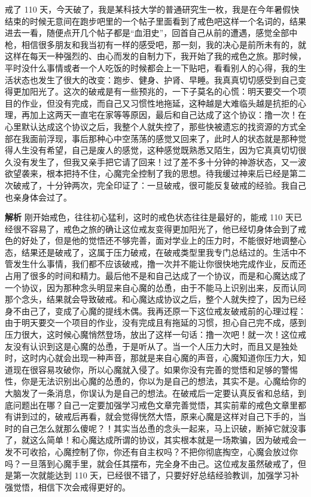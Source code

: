 \begin{case}
    戒了 110 天，今天破了，我是某科技大学的普通研究生一枚，我是在今年暑假快结束的时候无意间在跑步吧里的一个帖子里面看到了戒色吧这样一个名词的，结果进去一看，随便点开几个帖子都是“血泪史”，回首自己从前的遭遇，感觉全部中枪，相信很多朋友和我当初有一样的感受吧，那一刻，我的决心是前所未有的，就这样在每天一种强烈的、由心而发的自制力下，我开始了我的戒色之旅。那时候，平时没什么事情或者一个人吃饭的时候都会上一下贴吧，看看别人的心得，我的生活状态也发生了很大的改变：跑步、健身、护肾、早睡。我真真切切感受到自己变得更加阳光了。这次的破戒是有一些预兆的，一下子莫名的心慌：明天要交一个项目的作业，但没有完成，而自己又习惯性地拖延，这种越是大难临头越是抗拒的心理，再加上这两天一直宅在家等等原因，最后和自己达成了这个协议：撸一次！在心里默认达成这个协议之后，我整个人就失控了，那些快被遗忘的找资源的方式全部在我面前浮现，事后那种心中空荡荡的感觉又回来了，此时人的状态就是那种觉得人生没有希望，自己是废人的感觉，这种感觉既熟悉又陌生，因为它真真切切很久没有发生了，但我又亲手把它请了回来！过了差不多十分钟的神游状态，又一波欲望袭来，根本把持不住，心魔完全控制了我的思想。待我缓过神来后已经是第二次破戒了，十分钟两次，完全印证了：一旦破戒，很可能反复破戒的经验。我自己也亲身体会过了。

    \textbf{解析} 刚开始戒色，往往初心猛利，这时的戒色状态往往是最好的，能戒 110 天已经很不容易了，戒色之旅的确让这位戒友变得更加阳光了，他已经切身体会到了戒色的好处了，但是他的觉悟还不够完善，面对学业上的压力时，不能很好地调整心态，结果还是破戒了，这属于压力破戒，在破戒类型里我专门总结过的。生活中不管发生什么事情，我们都不应该破戒，撸一次并不能让你很快地完成作业，反而还占用了很多的时间和精力。最后他不是和自己达成了一个协议，而是和心魔达成了一个协议，因为那种念头明显来自心魔的怂恿，由于不能马上识别出来，反而认同那个念头，结果就会导致破戒。和心魔达成协议之后，整个人就失控了，因为已经身不由己了，变成了心魔的提线木偶。我再还原一下这位戒友破戒前的心理过程：由于明天要交一个项目的作业，没有完成且有拖延的习惯，担心自己完不成，感到压力很大，这时候心魔悄然登场，放出了这样一句话：撸一次吧！就一次！这位戒友没有认识到这是心魔的怂恿，于是听从了。当一个人压力大时，而且又是独处时，这时内心就会出现一种声音，那就是来自心魔的声音，心魔知道你压力大，知道现在很容易攻破你，所以心魔就入侵了。如果你没有完善的觉悟和足够的警惕性，你是无法识别出心魔的怂恿的，你以为是自己的想法，其实不是。心魔给你的大脑发了一条消息，你误认为是自己的想法。在破戒后一定要认真反省和总结，到底问题出在哪？自己一定要加强学习戒色文章完善觉悟，其实前辈的戒色文章里都有讲到过的，破戒后再看，就会觉得恍然大悟，原来心魔是这样对自己下手的，当时的自己怎么就那么傻呢？！其实当怂恿的念头一起来，马上识破，断掉它就没事了，就这么简单！和心魔达成所谓的协议，其实根本就是一场欺骗，因为破戒会一发不可收拾，心魔控制了你，你还有自主权吗？不把你彻底掏空，心魔会放过你吗？一旦落到心魔手里，就会任其摆布，完全身不由己。这位戒友虽然破戒了，但是第一次就能达到 110 天，已经很不错了，只要好好总结经验教训，加强学习补强觉悟，相信下次会戒得更好的。
\end{case}

